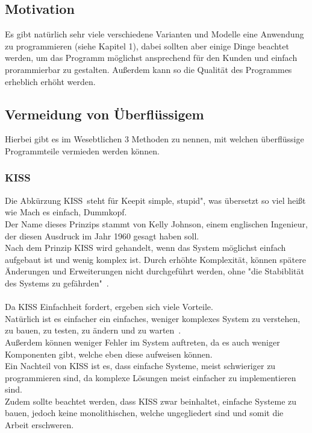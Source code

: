 \documentclass[a4paper, 10pt]{scrartcl}
\begin{document}
\subsection{Motivation}
Es gibt natürlich sehr viele verschiedene Varianten und Modelle eine Anwendung zu programmieren (siehe Kapitel 1), dabei sollten aber einige Dinge beachtet werden, um das Programm möglichst ansprechend für den Kunden und einfach prorammierbar zu gestalten. Außerdem kann so die Qualität des Programmes erheblich erhöht werden. 
\subsection{Vermeidung von Überflüssigem}
Hierbei gibt es im Wesebtlichen 3 Methoden zu nennen, mit welchen überflüssige Programmteile vermieden werden können.


\subsubsection{KISS}
Die Abkürzung \glqq KISS\grqq \ steht für \glqq Keep\grqq it simple, stupid", was übersetzt so viel heißt wie \glqq Mach es einfach, Dummkopf\grqq. \\
Der Name dieses Prinzips stammt von Kelly Johnson, einem englischen Ingenieur, der diesen Ausdruck im Jahr 1960 gesagt haben soll. \citep {goll_entwurfsprinzipien}  \\
Nach dem Prinzip KISS wird gehandelt, wenn das System möglichst einfach aufgebaut ist und wenig komplex ist. Durch erhöhte Komplexität, können spätere Änderungen und Erweiterungen nicht durchgeführt werden, ohne "die Stabiblität des Systems zu gefährden"\  \cite{goll_entwurfsprinzipien}.\\\\
Da KISS Einfachheit fordert, ergeben sich viele Vorteile. \\
Natürlich ist es einfacher ein einfaches, weniger komplexes System  \glqq zu verstehen, zu bauen, zu testen, zu ändern und zu warten\grqq\ \cite{goll_entwurfsprinzipien}.\\
Außerdem können weniger Fehler im System auftreten, da es auch weniger Komponenten gibt, welche eben diese aufweisen können.\\
Ein Nachteil von KISS ist es, dass einfache Systeme, meist schwieriger zu programmieren sind, da komplexe Lösungen meist einfacher zu implementieren sind.\\
Zudem sollte beachtet werden, dass KISS zwar beinhaltet, einfache Systeme zu bauen, jedoch keine monolithischen, welche ungegliedert sind und somit die Arbeit erschweren. \citep{goll_entwurfsprinzipien}
\end{document}
